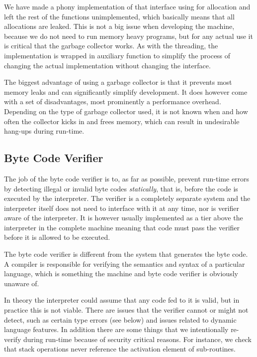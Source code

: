 We have made a phony implementation of that interface using  for
allocation and left the rest of the functions unimplemented, which basically
means that all allocations are leaked. This is not a big issue when developing
the machine, because we do not need to run memory heavy programs, but for any
actual use it is critical that the garbage collector works. As with the
threading, the implementation is wrapped in auxiliary function to simplify the
process of changing the actual implementation without changing the interface.

The biggest advantage of using a garbage collector is that it prevents most
memory leaks and can significantly simplify development. It does however come
with a set of disadvantages, most prominently a performance overhead. Depending
on the type of garbage collector used, it is not known when and how often the
collector kicks in and frees memory, which can result in undesirable hang-ups
during run-time.

\subsection{Byte Code Verifier}

The job of the byte code verifier is to, as far as possible, prevent run-time
errors by detecting illegal or invalid byte codes \emph{statically}, that is,
before the code is executed by the interpreter. The verifier is a completely
separate system and the interpreter itself does not need to interface with it at
any time, nor is verifier aware of the interpreter. It is however usually
implemented as a tier above the interpreter in the complete machine meaning that
code must pass the verifier before it is allowed to be executed.

The byte code verifier is different from the system that generates the byte
code. A compiler is responsible for verifying the semantics and syntax of a
particular language, which is something the machine and byte code verifier is
obviously unaware of.

In theory the interpreter could assume that any code fed to it is valid, but in
practice this is not viable. There are issues that the verifier cannot or might
not detect, such as certain type errors (see below) and issues related to
dynamic language features. In addition there are some things that we
intentionally re-verify during run-time because of security critical
reasons. For instance, we check that stack operations never reference the
activation element of sub-routines.

